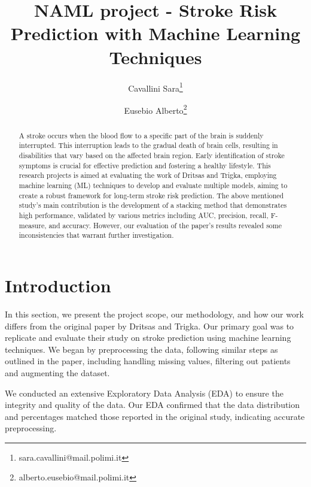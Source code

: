 \documentclass[twocolumn, 9pt]{extarticle}
\begin{document}
\title{NAML project - Stroke Risk Prediction with Machine Learning Techniques}

\author[1]{Cavallini Sara\thanks{sara.cavallini@mail.polimi.it}}
\author[2]{Eusebio Alberto\thanks{alberto.eusebio@mail.polimi.it}}


\setcounter{Maxaffil}{0}
\renewcommand\Affilfont{\itshape\small}

\date{}  
\maketitle


\begin{abstract}
A stroke occurs when the blood flow to a specific part of the brain is suddenly interrupted. This interruption leads to the gradual death of brain cells, resulting in disabilities that vary based on the affected brain region. Early identification of stroke symptoms is crucial for effective prediction and fostering a healthy lifestyle. This research projects is aimed at evaluating the work of Dritsas and Trigka\cite{s22134670}, employing machine learning (ML) techniques to develop and evaluate multiple models, aiming to create a robust framework for long-term stroke risk prediction. The above mentioned study's main contribution is the development of a stacking method that demonstrates high performance, validated by various metrics including AUC, precision, recall, F-measure, and accuracy. However, our evaluation of the paper's results revealed some inconsistencies that warrant further investigation.
\end{abstract}

\section{Introduction}
In this section, we present the project scope, our methodology, and how our work differs from the original paper by Dritsas and Trigka. Our primary goal was to replicate and evaluate their study on stroke prediction using machine learning techniques. We began by preprocessing the data, following similar steps as outlined in the paper, including handling missing values, filtering out patients and augmenting the dataset.

We conducted an extensive Exploratory Data Analysis (EDA) to ensure the integrity and quality of the data. Our EDA confirmed that the data distribution and percentages matched those reported in the original study, indicating accurate preprocessing.
\end{document}
